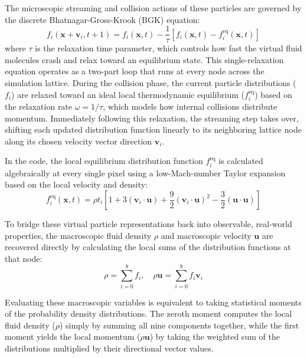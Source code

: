 \documentclass[11pt,a4paper]{article}
\begin{document}
The microscopic streaming and collision actions of these particles are governed by the discrete Bhatnagar-Gross-Krook (BGK) equation:
\begin{equation}
f_i(\mathbf{x} + \mathbf{v}_i, t + 1) = f_i(\mathbf{x}, t) - \frac{1}{\tau} \left[f_i(\mathbf{x}, t) - f_i^{\text{eq}}(\mathbf{x}, t)\right]
\end{equation}
where $\tau$ is the relaxation time parameter, which controls how fast the virtual fluid molecules crash and relax toward an equilibrium state. This single-relaxation equation operates as a two-part loop that runs at every node across the simulation lattice. During the collision phase, the current particle distributions ($f_i$) are relaxed toward an ideal local thermodynamic equilibrium ($f_i^{\text{eq}}$) based on the relaxation rate $\omega = 1/\tau$, which models how internal collisions distribute momentum. Immediately following this relaxation, the streaming step takes over, shifting each updated distribution function linearly to its neighboring lattice node along its chosen velocity vector direction $\mathbf{v}_i$.

In the code, the local equilibrium distribution function $f_i^{\text{eq}}$ is calculated algebraically at every single pixel using a low-Mach-number Taylor expansion based on the local velocity and density:
\begin{equation}
f_i^{\text{eq}}(\mathbf{x}, t) = \rho t_i \left[ 1 + 3(\mathbf{v}_i \cdot \mathbf{u}) + \frac{9}{2}(\mathbf{v}_i \cdot \mathbf{u})^2 - \frac{3}{2}(\mathbf{u} \cdot \mathbf{u}) \right]
\end{equation}

To bridge these virtual particle representations back into observable, real-world properties, the macroscopic fluid density $\rho$ and macroscopic velocity $\mathbf{u}$ are recovered directly by calculating the local sums of the distribution functions at that node:
\begin{equation}
\rho = \sum_{i=0}^{8} f_i, \quad \rho \mathbf{u} = \sum_{i=0}^{8} f_i \mathbf{v}_i
\end{equation}

Evaluating these macroscopic variables is equivalent to taking statistical moments of the probability density distributions. The zeroth moment computes the local fluid density ($\rho$) simply by summing all nine components together, while the first moment yields the local momentum ($\rho \mathbf{u}$) by taking the weighted sum of the distributions multiplied by their directional vector values. 
\end{document}
